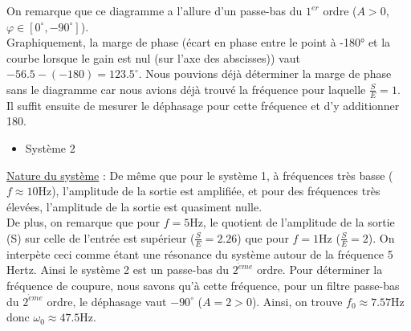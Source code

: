 \documentclass[12pt]{article}
\begin{document}
On remarque que ce diagramme a l'allure d'un passe-bas du $1^{er}$ ordre ($A > 0$, $\varphi \in [0^\circ,-90^\circ]$).
\\Graphiquement, la marge de phase (écart en phase entre le point à -180° et la courbe lorsque le gain est nul (sur l’axe des abscisses)) vaut $-56.5 - (-180) = 123.5^\circ$. Nous pouvions déjà déterminer la marge de phase sans le diagramme car nous avions déjà trouvé la fréquence pour laquelle $\frac{S}{E} = 1$.
\\Il suffit ensuite de mesurer le déphasage pour cette fréquence et d'y additionner 180.
\newpage


\begin{itemize}
    \item Système 2
\end{itemize}

\underline{Nature du système} : De même que pour le système 1, à fréquences très basse ($f \approx 10$Hz), l'amplitude de la sortie est amplifiée, et pour des fréquences très élevées, l'amplitude de la sortie est quasiment nulle.
\\De plus, on remarque que pour $f = 5$Hz, le quotient de l'amplitude de la sortie (S) sur celle de l'entrée est supérieur ($\frac{S}{E} = 2.26$) que pour $f = 1$Hz ($\frac{S}{E} = 2$). On interpète ceci comme étant une résonance du système autour de la fréquence 5 Hertz.
Ainsi le système 2 est un passe-bas du $2^{\grave{e}  me}$ ordre. Pour déterminer la fréquence de coupure, nous savons qu'à cette fréquence, pour un filtre passe-bas du $2^{\grave{e}me}$ ordre, le déphasage vaut $-90^\circ$ ($A = 2 > 0$). Ainsi, on trouve $f_0 \approx 7.57$Hz donc $\omega_0 \approx 47.5$Hz.
\end{document}
